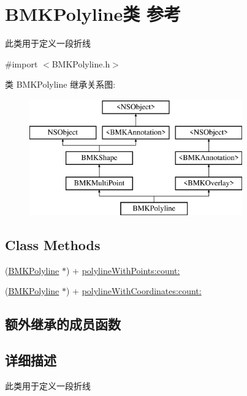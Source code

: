 \hypertarget{interface_b_m_k_polyline}{}\section{B\+M\+K\+Polyline类 参考}
\label{interface_b_m_k_polyline}


此类用于定义一段折线  




{\ttfamily \#import $<$B\+M\+K\+Polyline.\+h$>$}

类 B\+M\+K\+Polyline 继承关系图\+:\begin{figure}[H]
\begin{center}
\leavevmode
\includegraphics[height=5.000000cm]{interface_b_m_k_polyline}
\end{center}
\end{figure}
\subsection*{Class Methods}
\begin{DoxyCompactItemize}
\item 
(\hyperlink{interface_b_m_k_polyline}{B\+M\+K\+Polyline} $\ast$) + \hyperlink{interface_b_m_k_polyline_aa4f399b9bcc1c33b871b3d8152842eac}{polyline\+With\+Points\+:count\+:}
\item 
(\hyperlink{interface_b_m_k_polyline}{B\+M\+K\+Polyline} $\ast$) + \hyperlink{interface_b_m_k_polyline_af43f8ff39d6a8c56f28f3294f9c41681}{polyline\+With\+Coordinates\+:count\+:}
\end{DoxyCompactItemize}
\subsection*{额外继承的成员函数}


\subsection{详细描述}
此类用于定义一段折线 

